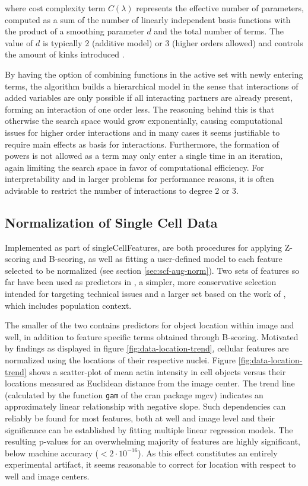 where cost complexity term $C(\lambda)$ represents the effective number of parameters, computed as a sum of the number of linearly independent basis functions with the product of a smoothing parameter $d$ and the total number of terms. The value of $d$ is typically 2 (additive model) or 3 (higher orders allowed) and controls the amount of kinks introduced \citep{Friedman1991}.

By having the option of combining functions in the active set with newly entering terms, the algorithm builds a hierarchical model in the sense that interactions of added variables are only possible if all interacting partners are already present, forming an interaction of one order less. The reasoning behind this is that otherwise the search space would grow exponentially, causing computational issues for higher order interactions and in many cases it seems justifiable to require main effects as basis for interactions. Furthermore, the formation of powers is not allowed as a term may only enter a single time in an iteration, again limiting the search space in favor of computational efficiency. For interpretability and in larger problems for performance reasons, it is often advisable to restrict the number of interactions to degree 2 or 3.

\subsection{Normalization of Single Cell Data}
\label{sub:norm-res}
Implemented as part of singleCellFeatures, are both procedures for applying Z-scoring and B-scoring, as well as fitting a user-defined  model to each feature selected to be normalized (see section \ref{sec:scf-aug-norm}). Two sets of features so far have been used as predictors in , a simpler, more conservative selection intended for targeting technical issues and a larger set based on the work of \citet{Knapp2011}, which includes population context.



The smaller of the two contains predictors for object location within image and well, in addition to feature specific terms obtained through B-scoring. Motivated by findings as displayed in figure \ref{fig:data-location-trend}, cellular features are normalized using the locations of their respective nuclei. Figure \ref{fig:data-location-trend} shows a scatter-plot of mean actin intensity in cell objects versus their locations measured as Euclidean distance from the image center. The trend line (calculated by the function \texttt{gam} of the \acrshort{cran} package mgcv) indicates an approximately linear relationship with negative slope. Such dependencies can reliably be found for most features, both at well and image level and their significance can be established by fitting multiple linear regression models. The resulting p-values for an overwhelming majority of features are highly significant, below machine accuracy ($<2\cdot10^{-16}$). As this effect constitutes an entirely experimental artifact, it seems reasonable to correct for location with respect to well and image centers.

